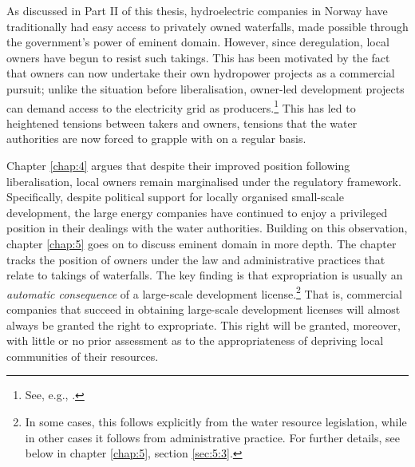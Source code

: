 As discussed in Part II of this thesis, hydroelectric companies in Norway have traditionally had easy access to privately owned waterfalls, made possible through the government's power of eminent domain. However, since deregulation, local owners have begun to resist such takings. This has been motivated by the fact that owners can now undertake their own hydropower projects as a commercial pursuit; unlike the situation before liberalisation, owner-led development projects can demand access to the electricity grid as producers.\footnote{See, e.g., \cite{uleberg08}.} This has led to heightened tensions between takers and owners, tensions that the water authorities are now forced to grapple with on a regular basis.


Chapter \ref{chap:4} argues that despite their improved position following liberalisation, local owners remain marginalised under the regulatory framework. Specifically, despite political support for locally organised small-scale development, the large energy companies have continued to enjoy a privileged position in their dealings with the water authorities. Building on this observation, chapter \ref{chap:5} goes on to discuss eminent domain in more depth. The chapter tracks the position of owners under the law and administrative practices that relate to takings of waterfalls. The key finding is that expropriation is usually an {\it automatic consequence} of a large-scale development license.\footnote{In some cases, this follows explicitly from the water resource legislation, while in other cases it follows from administrative practice. For further details, see below in chapter \ref{chap:5}, section \ref{sec:5:3}.} That is, commercial companies that succeed in obtaining large-scale development licenses will almost always be granted the right to expropriate. This right will be granted, moreover, with little or no prior assessment as to the appropriateness of depriving local communities of their resources.

